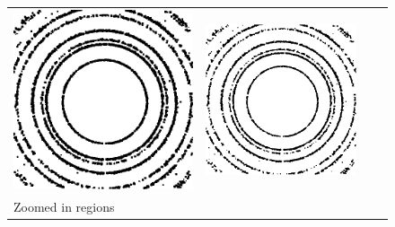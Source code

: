 \documentclass[preprint]{iucr}              %
\begin{document}
\begin{figure}
\begin{tabular}{>{\centering\arraybackslash}m{.1\linewidth}>{\centering\arraybackslash}m{.25\linewidth}>{\centering\arraybackslash}m{.25\linewidth}>{\centering\arraybackslash}m{.25\linewidth}}
\includegraphics[width=\linewidth]{Detail/DilatedFull.png}&
\includegraphics[width=\linewidth]{Detail/ThinnedFull.png}
\\
Zoomed in regions&

\end{tabular}
\end{figure}
\end{document}
